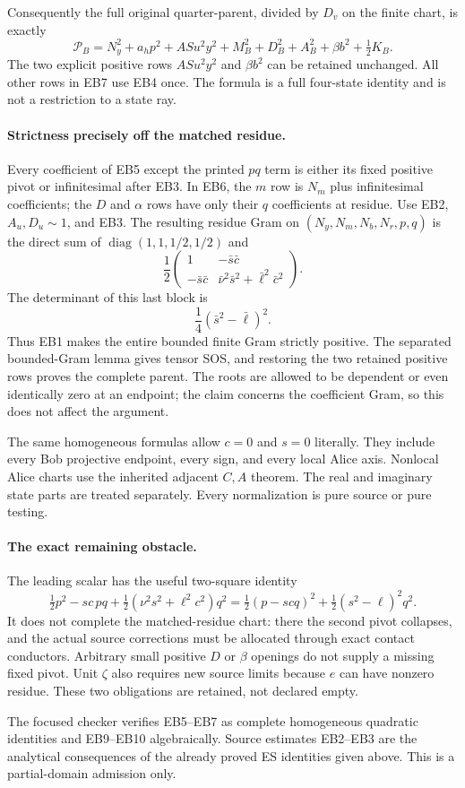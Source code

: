 Consequently the full original quarter-parent, divided by $D_v$ on
the finite chart, is exactly
\[
 \mathcal P_B=N_y^2+a_hp^2+ASu^2y^2
              +M_B^2+D_B^2+A_B^2+\beta b^2+\tfrac12K_B.
                                                               \tag{EB7}
\]
The two explicit positive rows $ASu^2y^2$ and $\beta b^2$ can be
retained unchanged. All other rows in EB7 use EB4 once. The formula
is a full four-state identity and is not a restriction to a state ray.

\paragraph{Strictness precisely off the matched residue.}
Every coefficient of EB5 except the printed $pq$ term is either
its fixed positive pivot or infinitesimal after EB3. In EB6, the
$m$ row is $N_m$ plus infinitesimal coefficients; the $D$ and
$\alpha$ rows have only their $q$ coefficients at residue.
Use EB2, $A_u,D_u\sim1$, and EB3. The resulting residue Gram on
$(N_y,N_m,N_b,N_r,p,q)$ is the direct sum of
$\operatorname{diag}(1,1,1/2,1/2)$ and
\[
 \frac12
 \begin{pmatrix}
 1&-\bar s\bar c\\
 -\bar s\bar c&\bar\nu^2\bar s^2+\bar\ell^2\bar c^2
 \end{pmatrix}.                                                \tag{EB8}
\]
The determinant of this last block is
\[
             \frac14(\bar s^2-\bar\ell)^2.                    \tag{EB9}
\]
Thus EB1 makes the entire bounded finite Gram strictly positive.
The separated bounded-Gram lemma gives tensor SOS, and restoring the
two retained positive rows proves the complete parent. The roots are
allowed to be dependent or even identically zero at an endpoint; the
claim concerns the coefficient Gram, so this does not affect the
argument.

The same homogeneous formulas allow $c=0$ and $s=0$ literally.
They include every Bob projective endpoint, every sign, and every
local Alice axis. Nonlocal Alice charts use the inherited adjacent
$C,A$ theorem. The real and imaginary state parts are treated
separately. Every normalization is pure source or pure testing.

\paragraph{The exact remaining obstacle.}
The leading scalar has the useful two-square identity
\[
 \tfrac12p^2-sc\,pq
 +\tfrac12(\nu^2s^2+\ell^2c^2)q^2
 =\tfrac12(p-scq)^2+\tfrac12(s^2-\ell)^2q^2.                  \tag{EB10}
\]
It does not complete the matched-residue chart: there the second
pivot collapses, and the actual source corrections must be allocated
through exact contact conductors. Arbitrary small positive $D$ or
$\beta$ openings do not supply a missing fixed pivot. Unit $\zeta$
also requires new source limits because $e$ can have nonzero residue.
These two obligations are retained, not declared empty.

The focused checker verifies EB5--EB7 as complete homogeneous
quadratic identities and EB9--EB10 algebraically. Source estimates
EB2--EB3 are the analytical consequences of the already proved
ES identities given above. This is a partial-domain admission only.
